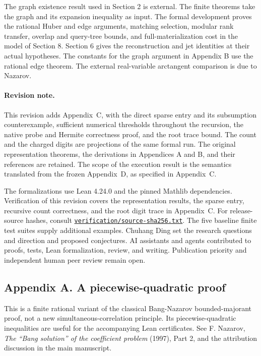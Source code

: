 \documentclass[
  11pt,
]{article}
\begin{document}
The graph existence result used in Section 2 is external. The finite
theorems take the graph and its expansion inequality as input. The
formal development proves the rational Huber and edge arguments,
matching selection, modular rank transfer, overlap and query-tree
bounds, and full-materialization cost in the model of Section 8.
Section 6 gives the reconstruction and jet identities at their actual
hypotheses. The constants for the graph argument in Appendix B use the
rational edge theorem. The external real-variable arctangent comparison
is due to Nazarov.

\paragraph{Revision note.}
This revision adds Appendix~C, with the direct sparse entry and its
subsumption counterexample, sufficient numerical thresholds throughout
the recursion, the native probe and Hermite correctness proof, and the
root trace bound. The count and the charged digits are projections of
the same formal run. The original representation theorems, the
derivations in Appendices A and B, and their references are retained.
The scope of the execution result is the semantics translated from
the frozen Appendix~D, as specified in Appendix~C.

The formalizations use Lean 4.24.0 and the pinned Mathlib dependencies.
Verification of this revision covers the representation results,
the sparse entry, recursive count correctness, and the root digit
trace in Appendix~C. For release-source hashes, consult
\href{../verification/source-sha256.txt}{\nolinkurl{verification/source-sha256.txt}}. The five baseline finite test
suites supply additional examples. Chuhang Ding set the research questions and direction and proposed conjectures. AI assistants and agents contributed to proofs, tests, Lean formalization, review, and writing.
Publication priority and independent human peer review remain open.

\clearpage
\subsection{Appendix A. A piecewise-quadratic
proof}\label{appendix-a.-a-piecewise-quadratic-proof}

This is a finite rational variant of the classical Bang-Nazarov
bounded-majorant proof, not a new simultaneous-correlation principle.
Its piecewise-quadratic inequalities are useful for the accompanying
Lean certificates. See F. Nazarov, \emph{The ``Bang solution'' of the
coefficient problem} (1997), Part 2, and the attribution discussion in
the main manuscript.
\end{document}
